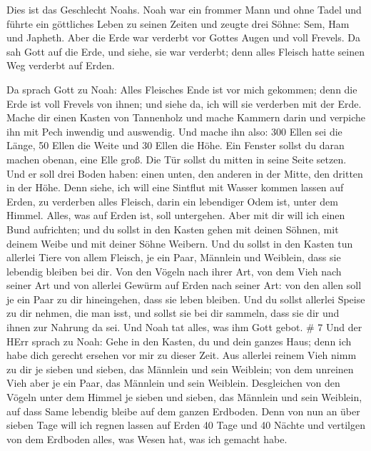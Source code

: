  Dies ist das Geschlecht Noahs. Noah war ein frommer Mann
und ohne Tadel und führte ein göttliches Leben zu seinen Zeiten
 und zeugte drei Söhne: Sem, Ham und Japheth. 
Aber die Erde war verderbt vor Gottes Augen und voll Frevels.
 Da sah Gott auf die Erde, und siehe, sie war verderbt;
denn alles Fleisch hatte seinen Weg verderbt auf Erden.

 Da sprach Gott zu Noah: Alles Fleisches Ende ist vor mich
gekommen; denn die Erde ist voll Frevels von ihnen; und siehe da, ich
will sie verderben mit der Erde.  Mache dir einen Kasten
von Tannenholz und mache Kammern darin und verpiche ihn mit Pech
inwendig und auswendig.  Und mache ihn also: 300 Ellen sei
die Länge, 50 Ellen die Weite und 30 Ellen die Höhe.  Ein
Fenster sollst du daran machen obenan, eine Elle groß. Die Tür sollst du
mitten in seine Seite setzen. Und er soll drei Boden haben: einen unten,
den anderen in der Mitte, den dritten in der Höhe.  Denn
siehe, ich will eine Sintflut mit Wasser kommen lassen auf Erden, zu
verderben alles Fleisch, darin ein lebendiger Odem ist, unter dem
Himmel. Alles, was auf Erden ist, soll untergehen.  Aber
mit dir will ich einen Bund aufrichten; und du sollst in den Kasten
gehen mit deinen Söhnen, mit deinem Weibe und mit deiner Söhne Weibern.
 Und du sollst in den Kasten tun allerlei Tiere von allem
Fleisch, je ein Paar, Männlein und Weiblein, dass sie lebendig bleiben
bei dir.  Von den Vögeln nach ihrer Art, von dem Vieh nach
seiner Art und von allerlei Gewürm auf Erden nach seiner Art: von den
allen soll je ein Paar zu dir hineingehen, dass sie leben bleiben.
 Und du sollst allerlei Speise zu dir nehmen, die man isst,
und sollst sie bei dir sammeln, dass sie dir und ihnen zur Nahrung da
sei.  Und Noah tat alles, was ihm Gott gebot. \# 7
 Und der HErr sprach zu Noah: Gehe in den Kasten, du und
dein ganzes Haus; denn ich habe dich gerecht ersehen vor mir zu dieser
Zeit.  Aus allerlei reinem Vieh nimm zu dir je sieben und
sieben, das Männlein und sein Weiblein; von dem unreinen Vieh aber je
ein Paar, das Männlein und sein Weiblein.  Desgleichen von
den Vögeln unter dem Himmel je sieben und sieben, das Männlein und sein
Weiblein, auf dass Same lebendig bleibe auf dem ganzen Erdboden.
 Denn von nun an über sieben Tage will ich regnen lassen auf
Erden 40 Tage und 40 Nächte und vertilgen von dem Erdboden alles, was
Wesen hat, was ich gemacht habe.

